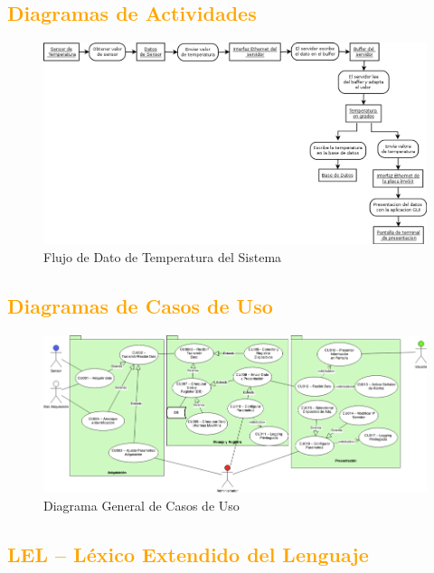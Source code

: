 \subsection{\textcolor{orange}{Diagramas de Actividades}}
\begin{figure}[h!]
 \begin{center}
  \includegraphics[width=1\textwidth,keepaspectratio=true]{img/diagactiv.png}
 \caption{Flujo de Dato de Temperatura del Sistema}
  \label{fig:esquema}
 \end{center}
\end{figure}


\subsection{\textcolor{orange}{Diagramas de Casos de Uso}}
\begin{figure}[h!]
 \begin{center}
  \includegraphics[width=1\textwidth,keepaspectratio=true]{img/usecases.png}
  \caption{Diagrama General de Casos de Uso}
  \label{fig:esquema}
 \end{center}
\end{figure}

\newpage
\subsection{\textcolor{orange}{LEL – Léxico Extendido del Lenguaje}}
	
